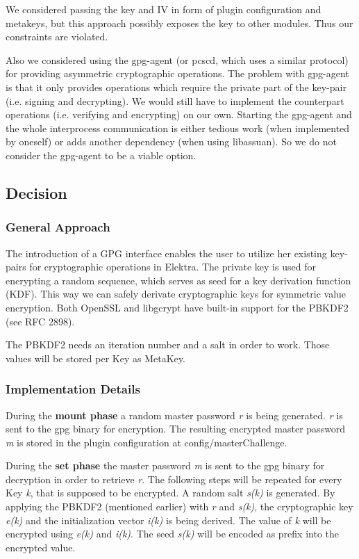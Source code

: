 We considered passing the key and I\+V in form of plugin configuration and metakeys, but this approach possibly exposes the key to other modules. Thus our constraints are violated.

Also we considered using the gpg-\/agent (or pcscd, which uses a similar protocol) for providing asymmetric cryptographic operations. The problem with gpg-\/agent is that it only provides operations which require the private part of the key-\/pair (i.\+e. signing and decrypting). We would still have to implement the counterpart operations (i.\+e. verifying and encrypting) on our own. Starting the gpg-\/agent and the whole interprocess communication is either tedious work (when implemented by oneself) or adds another dependency (when using libassuan). So we do not consider the gpg-\/agent to be a viable option.

\subsection*{Decision}

\subsubsection*{General Approach}

The introduction of a G\+P\+G interface enables the user to utilize her existing key-\/pairs for cryptographic operations in Elektra. The private key is used for encrypting a random sequence, which serves as seed for a key derivation function (K\+D\+F). This way we can safely derivate cryptographic keys for symmetric value encryption. Both Open\+S\+S\+L and libgcrypt have built-\/in support for the P\+B\+K\+D\+F2 (see R\+F\+C 2898).

The P\+B\+K\+D\+F2 needs an iteration number and a salt in order to work. Those values will be stored per Key as Meta\+Key.

\subsubsection*{Implementation Details}

During the {\bfseries mount phase} a random master password {\itshape r} is being generated. {\itshape r} is sent to the gpg binary for encryption. The resulting encrypted master password {\itshape m} is stored in the plugin configuration at {\ttfamily config/master\+Challenge}.

During the {\bfseries set phase} the master password {\itshape m} is sent to the gpg binary for decryption in order to retrieve {\itshape r}. The following steps will be repeated for every Key {\itshape k}, that is supposed to be encrypted. A random salt {\itshape s(k)} is generated. By applying the P\+B\+K\+D\+F2 (mentioned earlier) with {\itshape r} and {\itshape s(k)}, the cryptographic key {\itshape e(k)} and the initialization vector {\itshape i(k)} is being derived. The value of {\itshape k} will be encrypted using {\itshape e(k)} and {\itshape i(k)}. The seed {\itshape s(k)} will be encoded as prefix into the encrypted value.

